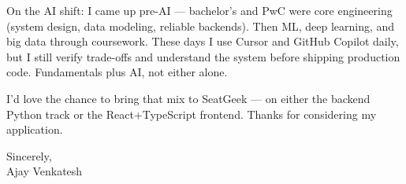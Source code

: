 \documentclass[letterpaper,11pt]{article}
\begin{document}
On the AI shift: I came up pre-AI --- bachelor's and PwC were core engineering (system design, data modeling, reliable backends). Then ML, deep learning, and big data through coursework. These days I use Cursor and GitHub Copilot daily, but I still verify trade-offs and understand the system before shipping production code. Fundamentals plus AI, not either alone.

I'd love the chance to bring that mix to SeatGeek --- on either the backend Python track or the React+TypeScript frontend. Thanks for considering my application.

\vspace{12pt}

Sincerely, \\
Ajay Venkatesh
\end{document}

